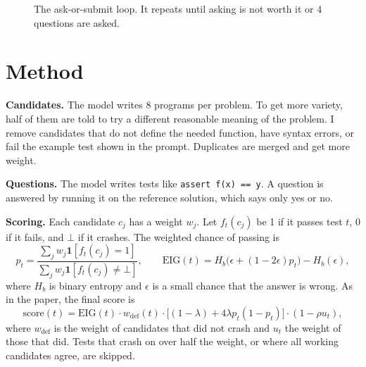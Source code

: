 \documentclass[11pt]{article}
\begin{document}
\begin{figure}[H]
\centering
{}
\caption{The ask-or-submit loop. It repeats until asking is not worth it or 4 questions are asked.}
\label{fig:loop}
\end{figure}

\section{Method}
\textbf{Candidates.} The model writes 8 programs per problem. To get more variety, half of them are told to try a different reasonable meaning of the problem. I remove candidates that do not define the needed function, have syntax errors, or fail the example test shown in the prompt. Duplicates are merged and get more weight.

\textbf{Questions.} The model writes tests like \texttt{assert f(x) == y}. A question is answered by running it on the reference solution, which says only yes or no.

\textbf{Scoring.} Each candidate $c_j$ has a weight $w_j$. Let $f_t(c_j)$ be 1 if it passes test $t$, 0 if it fails, and $\bot$ if it crashes. The weighted chance of passing is
\[
p_t = \frac{\sum_j w_j \mathbf{1}[f_t(c_j)=1]}{\sum_j w_j \mathbf{1}[f_t(c_j)\neq\bot]}, \qquad
\text{EIG}(t) = H_b\big(\epsilon + (1-2\epsilon)p_t\big) - H_b(\epsilon),
\]
where $H_b$ is binary entropy and $\epsilon$ is a small chance that the answer is wrong. As in the paper, the final score is
\[
\text{score}(t) = \text{EIG}(t)\cdot w_{\text{def}}(t)\cdot\big[(1-\lambda)+4\lambda p_t(1-p_t)\big]\cdot(1-\rho u_t),
\]
where $w_{\text{def}}$ is the weight of candidates that did not crash and $u_t$ the weight of those that did. Tests that crash on over half the weight, or where all working candidates agree, are skipped.
\end{document}

